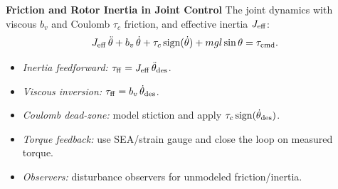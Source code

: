 \documentclass[12pt,a4paper]{article}
\begin{document}
\textbf{Friction and Rotor Inertia in Joint Control}
The joint dynamics with viscous $b_v$ and Coulomb $\tau_c$ friction, and effective inertia $J_{\rm eff}$:
\[
J_{\rm eff}\,\ddot\theta + b_v\,\dot\theta + \tau_c\,\mathrm{sign}(\dot\theta)
+ mgl\sin\theta
= \tau_{\rm cmd}.
\]
\begin{itemize}
  \item \emph{Inertia feedforward:} $\tau_{\rm ff}=J_{\rm eff}\,\ddot\theta_{\rm des}$.
  \item \emph{Viscous inversion:} $\tau_{\rm ff}=b_v\,\dot\theta_{\rm des}$.
  \item \emph{Coulomb dead-zone:} model stiction and apply $\tau_c\,\mathrm{sign}(\dot\theta_{\rm des})$.
  \item \emph{Torque feedback:} use SEA/strain gauge and close the loop on measured torque.
  \item \emph{Observers:} disturbance observers for unmodeled friction/inertia.
\end{itemize}

\vfill




   
\end{document}
